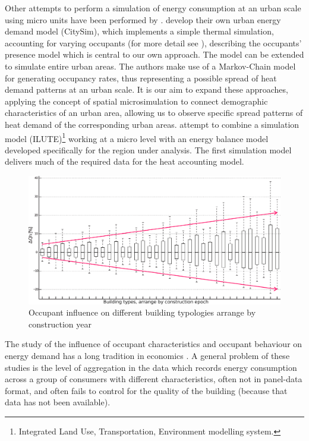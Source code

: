 \documentclass[11pt]{IJM-article}
\begin{document}
Other attempts to perform a simulation of energy consumption at an urban scale
using micro units have been performed by .  \citeauthor{Haldi.2011} develop their own urban energy demand
model (CitySim), which implements a simple thermal simulation, accounting for
varying occupants (for more detail see ), describing the occupants' presence model which is central to our
own approach. The model can be extended to simulate entire urban areas.  The
authors make use of a Markov-Chain model for generating occupancy rates, thus
representing a possible spread of heat demand patterns at an urban scale.  It
is our aim to expand these approaches, applying the concept of spatial
microsimulation to connect demographic characteristics of an urban area,
allowing us to observe specific spread patterns of heat demand of the
corresponding urban areas. \citeauthor{Chingcuanco.2012} attempt to combine a
simulation model (ILUTE)\footnote{Integrated Land Use, Transportation,
Environment modelling system.} working at a micro level with an energy balance
model developed specifically for the region under analysis. The first
simulation model delivers much of the required data for the heat accounting
model.\\

\begin{figure}[htb]
    \caption{Occupant influence on different building typologies arrange by
    	construction year} 
    \label{fig:3} 
    \includegraphics[width=\linewidth]{FIGURES/Typ_different_dim_percentage_line.eps}
\end{figure}

The study of the influence of occupant characteristics and occupant behaviour
on energy demand has a long tradition in economics . A general problem of these
studies is the level of aggregation in the data which records energy
consumption across a group of consumers with different characteristics, often
not in panel-data format, and often fails to control for the quality of the
building (because that data has not been available).\\
\end{document}
